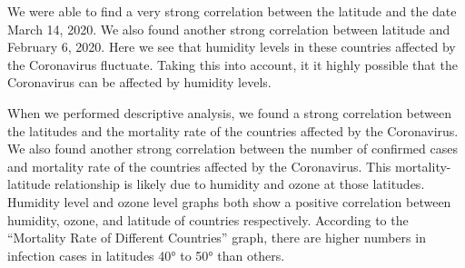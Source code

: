 \documentclass[10pt,journal,compsoc]{IEEEtran}
\begin{document}
	We were able to find a very strong correlation between the latitude and the date March 14, 2020. We also found another strong correlation between latitude and February 6, 2020. Here we see that humidity levels in these countries affected by the Coronavirus fluctuate. Taking this into account, it it highly possible that the Coronavirus can be affected by humidity levels. 

	When we performed descriptive analysis, we found a strong correlation between the latitudes and the mortality rate of the countries affected by the Coronavirus. We also found another strong correlation between the number of confirmed cases and mortality rate of the countries affected by the Coronavirus. This mortality-latitude relationship is likely due to humidity and ozone at those latitudes. Humidity level and ozone level graphs both show a positive correlation between humidity, ozone, and latitude of countries respectively. According to the “Mortality Rate of Different Countries” graph, there are higher numbers in infection cases in latitudes 40° to 50° than others.
\newline \newline \newline
\end{document}
